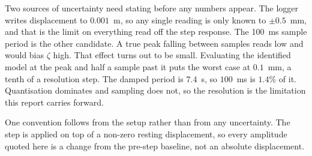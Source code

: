 Two sources of uncertainty need stating before any numbers appear. The logger writes
displacement to $0.001$~m, so any single reading is only known to $\pm 0.5$~mm, and that is the
limit on everything read off the step response. The 100~ms sample period is the other
candidate. A true peak falling between samples reads low and would bias $\zeta$ high. That
effect turns out to be small. Evaluating the identified model at the peak and half a sample
past it puts the worst case at $0.1$~mm, a tenth of a resolution step. The damped period is
$7.4$~s, so $100$~ms is $1.4$\% of it. Quantisation dominates and sampling does not, so the
resolution is the limitation this report carries forward.

One convention follows from the setup rather than from any uncertainty. The step is applied
on top of a non-zero resting displacement, so every amplitude quoted here is a change from
the pre-step baseline, not an absolute displacement.
